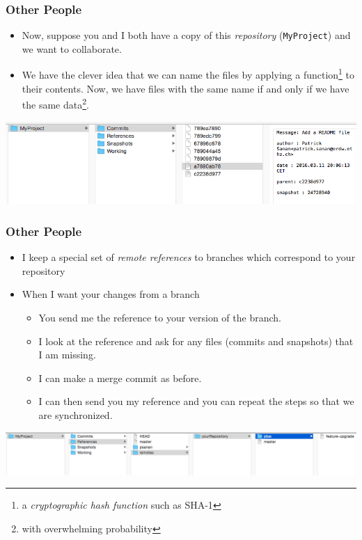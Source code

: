 \begin{frame}[fragile]
\frametitle{Other People}
\begin{itemize}
\item Now, suppose you and I both have a copy of this \emph{repository} (\texttt{MyProject}) and we want to collaborate.
\item We have the clever idea that we can name the files by applying a function\footnote{a \emph{cryptographic hash function} such as SHA-1} to their contents. Now, we have files with the same name if and only if we have the same data\footnote{with overwhelming probability}.
\end{itemize}
\includegraphics[scale=0.4]{remote1.png}\\
\vspace{10px}
\end{frame}

\begin{frame}[fragile]
\frametitle{Other People}
\begin{itemize}
\item I keep a special set of \emph{remote references} to branches which correspond to your repository
\item When I want your changes from a branch
\begin{itemize}
\item You send me the reference to your version of the branch.
\item I look at the reference and ask for any files (commits and snapshots) that I am missing.
\item I can make a merge commit as before.
\item I can then send you my reference and you can repeat the steps so that we are synchronized.
\end{itemize}
\end{itemize}
\includegraphics[scale=0.3]{remote2.png}
\vspace{10px}
\end{frame}

